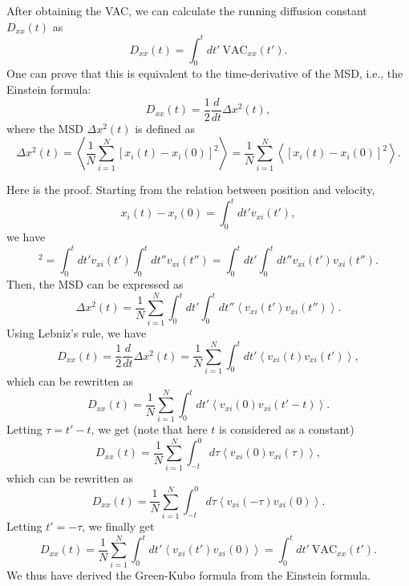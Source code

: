 \documentclass[12pt,a4paper]{report}
\begin{document}
After obtaining the VAC, we can calculate the running diffusion constant $D_{xx}(t)$ as
\begin{equation}
\boxed{
D_{xx}(t) = \int_0^{t} dt' ~\text{VAC}_{xx}(t')
}.
\end{equation}
One can prove that this is equivalent to the time-derivative of the MSD, i.e., the Einstein formula:
\begin{equation}
\boxed{
D_{xx}(t) = \frac{1}{2} \frac{d}{dt} \Delta x^2(t)
},
\end{equation}
where the MSD $\Delta x^2(t)$ is defined as
\begin{equation}
\boxed{
\Delta x^2(t) =
\left\langle
\frac{1}{N} \sum_{i=1}^{N}  \left[ x_i(t) - x_i(0) \right]^2
\right\rangle =
\frac{1}{N} \sum_{i=1}^{N}
\left\langle
  \left[ x_i(t) - x_i(0) \right]^2
\right\rangle
}.
\end{equation}

Here is the proof. Starting from the relation between position and velocity,
\begin{equation}
x_i(t) - x_i(0) = \int_{0}^{t}dt' v_{xi}(t'),
\end{equation}
we have
\begin{equation}
[x_i(t) - x_i(0)]^2 =
\int_{0}^{t} dt' v_{xi}(t') \int_{0}^{t}dt''  v_{xi}(t'')=
\int_{0}^{t} dt' \int_{0}^{t}dt'' v_{xi}(t') v_{xi}(t'').
\end{equation}
Then, the MSD can be expressed as
\begin{equation}
\Delta x^2(t) =
\frac{1}{N}\sum_{i=1}^{N}
\int_{0}^{t} dt' \int_{0}^{t}dt''
\left\langle v_{xi}(t') v_{xi}(t'') \right\rangle.
\end{equation}
Using Lebniz's rule, we have
\begin{equation}
D_{xx}(t) = \frac{1}{2} \frac{d}{dt} \Delta x^2(t) =
\frac{1}{N}\sum_{i=1}^{N}
\int_{0}^{t} dt'
\left\langle v_{xi}(t) v_{xi}(t') \right\rangle,
\end{equation}
which can be rewritten as
\begin{equation}
D_{xx}(t) =
\frac{1}{N}\sum_{i=1}^{N}
\int_{0}^{t} dt'
\left\langle v_{xi}(0) v_{xi}(t'-t) \right\rangle.
\end{equation}
Letting $\tau=t'-t$, we get (note that here $t$ is considered as a constant)
\begin{equation}
D_{xx}(t) =
\frac{1}{N}\sum_{i=1}^{N}
\int_{-t}^{0} d\tau
\left\langle v_{xi}(0) v_{xi}(\tau) \right\rangle,
\end{equation}
which can be rewritten as
\begin{equation}
D_{xx}(t) =
\frac{1}{N}\sum_{i=1}^{N}
\int_{-t}^{0} d\tau
\left\langle v_{xi}(-\tau) v_{xi}(0) \right\rangle.
\end{equation}
Letting $t'=-\tau$, we finally get
\begin{equation}
D_{xx}(t) =
\frac{1}{N}\sum_{i=1}^{N}
\int_{0}^{t} dt'
\left\langle v_{xi}(t') v_{xi}(0) \right\rangle
=\int_0^t dt' ~\text{VAC}_{xx}(t').
\end{equation}
We thus have derived the Green-Kubo formula from the Einstein formula.
\end{document}
